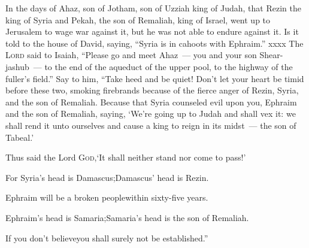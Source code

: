 
\begin{inparaenum}
   In the days of Ahaz, son of Jotham, son of Uzziah king of Judah, that Rezin the king of Syria and Pekah, the son of Remaliah, king of Israel, went up to Jerusalem to wage war against it, but he was not able to%
  endure against it.%
   Is it told to the house of David, saying, ``Syria is in cahoots with Ephraim.'' xxxx%
   The \textsc{Lord} said to Isaiah, ``Please go and meet Ahaz~--- you and your son Shear-jashub~--- to the end of the aqueduct of the upper pool, to the highway of the fuller's field.''%
   Say to him, ``Take heed and be quiet! Don't let your heart be timid before these two, smoking firebrands because of the fierce anger of Rezin, Syria, and the son of Remaliah.%
   Because that Syria counseled evil upon you, Ephraim and the son of Remaliah, saying,%
   `We're going up to Judah and shall vex it: we shall rend it unto ourselves and cause a king to reign in its midst~--- the son of Tabeal.'\smallskip%
  
  \pa {} Thus said the Lord \textsc{God},\pa `It shall neither stand nor come to pass!'%
  
  \pa {} For Syria's head is Damascus;\pa Damascus' head is Rezin.%
  
  \pb Ephraim will be a broken people\pa within sixty-five years.%
  
  \pa {} Ephraim's head is Samaria;\pa Samaria's head is the son of Remaliah.%
  
  \pb If you don't believe\pa you shall surely not be established.''\smallskip%
  

\end{inparaenum}
